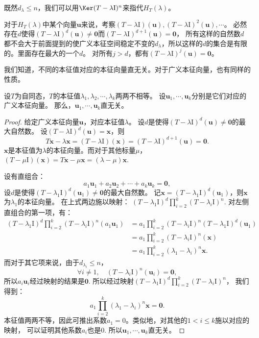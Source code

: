 \documentclass[12pt,UTF8,fontset=none]{ctexbook}
\begin{document}
既然$d_\lambda \leqslant n$，我们可以用$\Ker (T - \lambda\mathrm{I})^n$来指代$H_T(\lambda)$。

对于$H_T(\lambda)$中某个向量$\mathbf{u}$来说，考察$(T - \lambda\mathrm{I})(\mathbf{u}), (T - \lambda\mathrm{I})^2(\mathbf{u}), \cdots$。
必然存在$d$使得$(T - \lambda\mathrm{I})^{d}(\mathbf{u}) \neq \mathbf{0}$而$(T - \lambda\mathrm{I})^{d+1}(\mathbf{u}) = \mathbf{0}$，
所有这样的自然数$d$都不会大于前面提到的使广义本征空间稳定不变的$d_\lambda$，所以这样的$d$的集合是有限的。里面存在最大的一个$d$。
对所有$j>d$，都有$(T - \lambda\mathrm{I})^{j}(\mathbf{u}) = \mathbf{0}$。

我们知道，不同的本征值对应的本征向量直无关。对于广义本征向量，也有同样的性质。

\begin{pp}\label{pp:6_12_0}
设$T$为自同态，$T$的本征值$\lambda_1, \lambda_2, \cdots, \lambda_k$两两不相等。
设$\mathbf{u}_1, \cdots , \mathbf{u}_k$分别是它们对应的广义本征向量。
那么，$\mathbf{u}_1, \cdots , \mathbf{u}_k$直无关。
\end{pp}
\begin{proof} %
给定广义本征向量$\mathbf{u}$，对应本征值$\lambda$。
设$d$是使得$(T - \lambda\mathrm{I})^{d}(\mathbf{u}) \neq \mathbf{0}$的最大自然数。
设$(T - \lambda\mathrm{I})^{d}(\mathbf{u}) = \mathbf{x}$，则
$$T\mathbf{x} - \lambda \mathbf{x} = (T - \lambda\mathrm{I})(\mathbf{x}) = (T - \lambda\mathrm{I})^{d+1}(\mathbf{u}) = \mathbf{0}.$$
$\mathbf{x}$是本征值为$\lambda$的本征向量。而对于其他标量$\mu$，
$(T - \mu\mathrm{I})(\mathbf{x}) = T\mathbf{x} - \mu\mathbf{x} = (\lambda - \mu)\mathbf{x}.$

设有直组合：
$$ a_1\mathbf{u}_1 + a_2\mathbf{u}_2 + \cdots + a_k\mathbf{u}_k = \mathbf{0},$$
设$d$是使得$(T - \lambda_1\mathrm{I})^{d}(\mathbf{u}_1) \neq \mathbf{0}$的最大自然数。
记$\mathbf{x} = (T - \lambda_1\mathrm{I})^{d}(\mathbf{u}_1)$，则$\mathbf{x}$为$\lambda_1$的本征向量。
在上式两边施以映射：
$(T - \lambda_1\mathrm{I})^{d}\prod_{i=2}^k (T - \lambda_i\mathrm{I})^{n}$.  
对左侧直组合的第一项，有：
\begin{align*}
(T - \lambda_1\mathrm{I})^{d}\prod_{i=2}^k (T - \lambda_i\mathrm{I})^{n}(a_1\mathbf{u}_1) 
&= a_1\prod_{i=2}^k (T - \lambda_i\mathrm{I})^{n}(T - \lambda_1\mathrm{I})^{d}(\mathbf{u}_1)  \\
&= a_1\prod_{i=2}^k (T - \lambda_i\mathrm{I})^{n}(\mathbf{x})  \\
&= a_1\prod_{i=2}^k (\lambda_1 - \lambda_i)^{n}\mathbf{x}.
\end{align*}
而对于其它项来说，由于$d_{\lambda_i} \leqslant n$，
$$ \forall i \neq 1, \quad (T - \lambda_i\mathrm{I})^{n}(\mathbf{u}_i) = \mathbf{0},$$
所以$a_i\mathbf{u}_i$经过映射的结果是$\mathbf{0}$.
所以经过映射$(T - \lambda_1\mathrm{I})^{d}\prod_{i=2}^k (T - \lambda_i\mathrm{I})^{n}$，
我们得到：
$$a_1\prod_{i=2}^k (\lambda_1 - \lambda_i)^{n}\mathbf{x} = \mathbf{0}.$$
本征值两两不等，因此可推出系数$a_1 = 0$。类似地，对其他的$1 < i \leqslant k $施以对应的映射，
可以证明其他系数$a_i$也是$0$. 所以$\mathbf{u}_1, \cdots , \mathbf{u}_k$直无关。

\end{proof}
\end{document}
